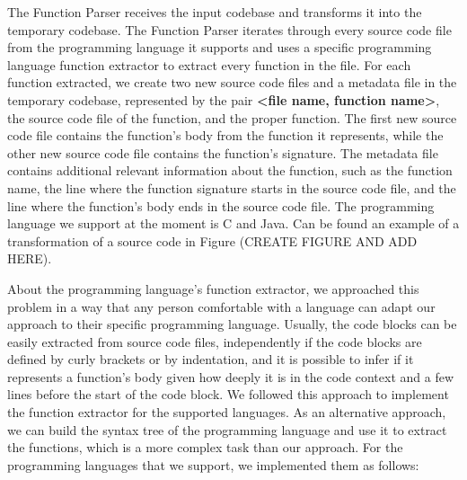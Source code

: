 The Function Parser receives the input codebase and transforms it into the temporary codebase. The 
Function Parser iterates through every source code file from the programming language it supports 
and uses a specific programming language function extractor to extract every function in the file. 
For each function extracted, we create two new source code files and a metadata file in the temporary 
codebase, represented by the pair \textbf{<file name, function name>},  the source code file of the function, and the proper function. 
The first new source code file contains the function’s body from the function it represents, while 
the other new source code file contains the function’s signature. The metadata file contains 
additional relevant information about the function, such as the function name, the line where the 
function signature starts in the source code file, and the line where the function’s body ends in 
the source code file. The programming language we support at the moment is C and Java. Can be found 
an example of a transformation of a source code in Figure (CREATE FIGURE AND ADD HERE).

About the programming language’s function extractor, we approached this problem in a way that any 
person comfortable with a language can adapt our approach to their specific programming language. 
Usually, the code blocks can be easily extracted from source code files, independently if the code 
blocks are defined by curly brackets or by indentation, and it is possible to infer if it represents 
a function’s body given how deeply it is in the code context and a few lines before the start of the 
code block. We followed this approach to implement the function extractor for the supported languages. 
As an alternative approach, we can build the syntax tree \citep{compiler} 
of the programming language and use it to extract the functions, which is a more complex task than 
our approach. For the programming languages that we support, we implemented them as follows:

